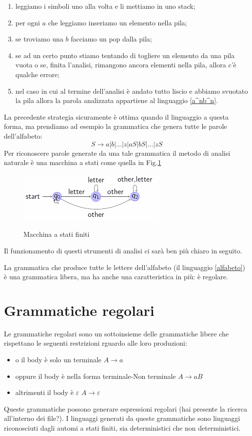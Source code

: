 \documentclass[class=book, crop=false, oneside, 12pt]{standalone}
\begin{document}
\begin{enumerate}
    \item leggiamo i simboli uno alla volta e li mettiamo in uno stack;
    \item per ogni $a$ che leggiamo inseriamo un elemento nella pila;
    \item se troviamo una $b$ facciamo un pop dalla pila;
    \item se ad un certo punto stiamo tentando di togliere un elemento da una pila vuota o se, finita l’analisi, rimangono ancora elementi nella pila, allora c’è qualche errore;
    \item nel caso in cui al termine dell’analisi è andato tutto liscio e abbiamo svuotato la pila allora la parola analizzata appartiene al linguaggio \ref{a^nb^n}.
\end{enumerate} 
La precedente strategia sicuramente è ottima quando il linguaggio a questa forma, ma prendiamo ad esempio la grammatica che genera tutte le parole dell’alfabeto:
\begin{equation}
    \label{alfabeto}
    S \to a | b | … | z | aS | bS | … | zS
\end{equation}
Per riconoscere parole generate da una tale grammatica il metodo di analisi naturale è una macchina a stati come quella in Fig.\ref{macchina_a_stati_finiti}
\begin{figure}
    \centering
    \includegraphics[width=.5\textwidth,keepaspectratio]{macchina_a_stati_finiti}
    \label{macchina_a_stati_finiti}
    \caption{Macchina a stati finiti}
\end{figure}
Il funzionamento di questi strumenti di analisi ci sarà ben più chiaro in seguito.

La grammatica che produce tutte le lettere dell’alfabeto (il linguaggio \ref{alfabeto}) è una grammatica libera, ma ha anche una caratteristica in più: è regolare.


\section{Grammatiche regolari}

Le grammatiche regolari sono un sottoinsieme delle grammatiche libere che rispettano le seguenti restrizioni rguardo alle loro produzioni:
\begin{itemize}
    \item o il body è solo un terminale \(A \to a\)
    \item oppure il body è nella forma terminale-Non terminale \(A \to aB\)  
    \item altrimenti il body è \(\varepsilon\) \(A \to \varepsilon\)
\end{itemize}
Queste grammatiche possono generare espressioni regolari (hai presente la ricerca all’interno dei file?).
I linguaggi generati da queste grammatiche sono linguaggi riconosciuti dagli automi a stati finiti, sia deterministici che non deterministici.
\end{document}
